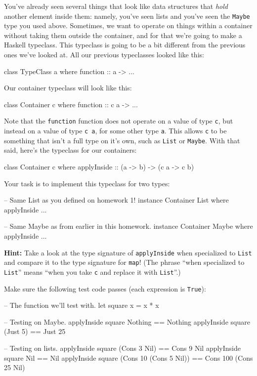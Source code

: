 \documentclass{article}
\begin{document}
You've already seen several things that look like data structures that \emph{hold} another element
inside them: namely, you've seen lists and you've seen the \texttt{Maybe} type you used above.
Sometimes, we want to operate on things within a container without taking them outside the
container, and for that we're going to make a Haskell typeclass. This typeclass is going to be a bit
different from the previous ones we've looked at. All our previous typeclasses looked like this:
\begin{haskellcode}
class TypeClass a where
    function :: a -> ...
\end{haskellcode}
Our container typeclass will look like this:
\begin{haskellcode}
class Container c where
    function :: c a -> ...
\end{haskellcode}
Note that the \texttt{function} function does not operate on a value of type \texttt{c}, but instead
on a value of type \texttt{c a}, for some other type \texttt{a}. This allows \texttt{c} to be
something that isn't a full type on it's own, such as \texttt{List} or \texttt{Maybe}. With that
said, here's the typeclass for our containers:
\begin{haskellcode}
class Container c where
  applyInside :: (a -> b) -> (c a -> c b)
\end{haskellcode}
Your task is to implement this typeclass for two types:
\begin{haskellcode}
-- Same List as you defined on homework 1!
instance Container List where
  applyInside ...

-- Same Maybe as from earlier in this homework.
instance Container Maybe where
  applyInside ...
\end{haskellcode}
\textbf{Hint:} Take a look at the type signature of \texttt{applyInside} when specialized to \texttt{List} and
compare it to the type signature for \texttt{map}! (The phrase ``when specialized to \texttt{List}'' means ``when
you take \texttt{c} and replace it with \texttt{List}''.)

Make sure the following test code passes (each expression is \texttt{True}):
\begin{haskellcode}
-- The function we'll test with.
let square x = x * x

-- Testing on Maybe.
applyInside square Nothing == Nothing
applyInside square (Just 5) == Just 25

-- Testing on lists.
applyInside square (Cons 3 Nil) == Cons 9 Nil
applyInside square Nil == Nil
applyInside square (Cons 10 (Cons 5 Nil)) == Cons 100 (Cons 25 Nil)
\end{haskellcode}
\end{document}
